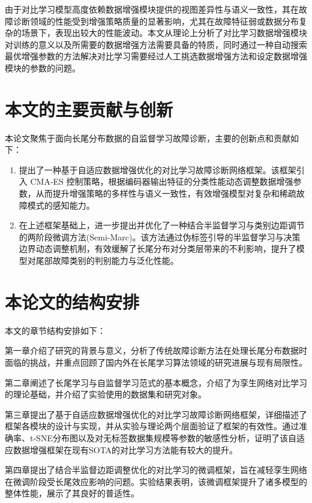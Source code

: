 \documentclass[master]{thesis-uestc}
\begin{document}
由于对比学习模型高度依赖数据增强模块提供的视图差异性与语义一致性，其在故障诊断领域的性能受到增强策略质量的显著影响，尤其在故障特征弱或数据分布复杂的场景下，表现出较大的性能波动。本文从理论上分析了对比学习数据增强模块对训练的意义以及所需要的数据增强方法需要具备的特质，同时通过一种自动搜索最优增强参数的方法解决对比学习需要经过人工挑选数据增强方法和设定数据增强模块的参数的问题。
\FloatBarrier  %

\section{本文的主要贡献与创新}

本论文聚焦于面向长尾分布数据的自监督学习故障诊断，主要的创新点和贡献如下：

\begin{enumerate}[label={(\arabic*)}]
    \item 提出了一种基于自适应数据增强优化的对比学习故障诊断网络框架。该框架引入 CMA-ES 控制策略，根据编码器输出特征的分类性能动态调整数据增强参数，从而提升增强策略的多样性与语义一致性，有效增强模型对复杂和稀疏故障模式的感知能力。
    
    \item 在上述框架基础上，进一步提出并优化了一种结合半监督学习与类别边距调节的两阶段微调方法(Semi-Marc)。该方法通过伪标签引导的半监督学习与决策边界动态调整机制，有效缓解了长尾分布对分类层带来的不利影响，提升了模型对尾部故障类别的判别能力与泛化性能。
\end{enumerate}


\section{本论文的结构安排}

本文的章节结构安排如下：

第一章介绍了研究的背景与意义，分析了传统故障诊断方法在处理长尾分布数据时面临的挑战，并重点回顾了国内外在长尾学习算法领域的研究进展与现有局限性。

第二章阐述了长尾学习与自监督学习范式的基本概念，介绍了为孪生网络对比学习的理论基础，并介绍了实验使用的数据集和研究对象。

第三章提出了基于自适应数据增强优化的对比学习故障诊断网络框架，详细描述了框架各模块的设计与实现，并从实验与理论两个层面验证了框架的有效性。通过准确率、t-SNE分布图以及对无标签数据集规模等参数的敏感性分析，证明了该自适应数据增强框架在现有SOTA的对比学习方法能有较大的提升。

第四章提出了结合半监督边距调整优化的对比学习的微调框架，旨在减轻孪生网络在微调阶段受长尾效应影响的问题。实验结果表明，该微调框架提升了诸多模型的整体性能，展示了其良好的普适性。
\end{document}
